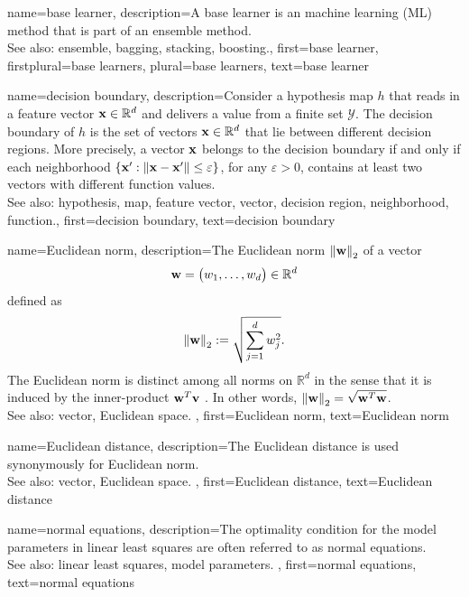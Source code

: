 {
{name={base learner}, 
 description={A base learner is an machine learning (ML) method 
              that is part of an ensemble method. \\
		See also: ensemble, bagging, stacking, boosting.},
	first={base learner},
	firstplural={base learners},
	plural={base learners},
	text={base learner} 
}	


{name={decision boundary}, 
	description={Consider a 
		hypothesis map $h$ that reads in a feature vector  
		${\bf x} \in \mathbb{R}^{d}$ and delivers a value from a finite set $\mathcal{Y}$. 
		The decision boundary of $h$ is the set of vectors ${\bf x} \in \mathbb{R}^{d}$ 
		that lie between different decision regions. More precisely, a 
		vector ${\bf x}$ belongs to the decision boundary if and only 
		if each neighborhood $\{ {\bf x}': \| {\bf x} - {\bf x}' \| \leq \varepsilon \}$, 
		for any $\varepsilon >0$, contains at least two vectors with different function values.
				\\
		See also: hypothesis, map, feature vector, vector, decision region, neighborhood, function.},
	first={decision boundary},
	text={decision boundary} 
}


{name={Euclidean norm}, 
	description={The 
		Euclidean norm $\mleft\lVert {\bf w} \mright\rVert_{2}$ of a vector 
		$${\bf w} = \big(w_{1},\ldots,w_{d} \big) \in
		\mathbb{R}^{d}$$
		defined as 
		$$\mleft\lVert {\bf w} \mright\rVert_{2} := \sqrt{\sum_{j=1}^{d}w^2_{j}}.$$ 
		The Euclidean norm is distinct among all norms on $\mathbb{R}^{d}$ in the sense 
		that it is induced by the inner-product ${\bf w}^{T} {\bf v}$ \cite{RudinBook,HalmosFiniteDimVecSpace,BoydConvexBook}. 
		In other words, $\mleft\lVert {\bf w} \mright\rVert_{2}= \sqrt{{\bf w}^{T} {\bf w}}$.	\\
		See also: vector, Euclidean space. },
	first={Euclidean norm},
	text={Euclidean norm} 
}

{name={Euclidean distance}, 
	description={The Euclidean distance is used 
	synonymously for Euclidean norm.	\\
	See also: vector, Euclidean space. },
	first={Euclidean distance},
	text={Euclidean distance} 
}

{name={normal equations}, 
	description={The optimality condition for the model parameters 
	in linear least squares are often referred to as normal equations.\\ 
	See also: linear least squares, model parameters. 
	},
	first={normal equations},
	text={normal equations} 
}


}
